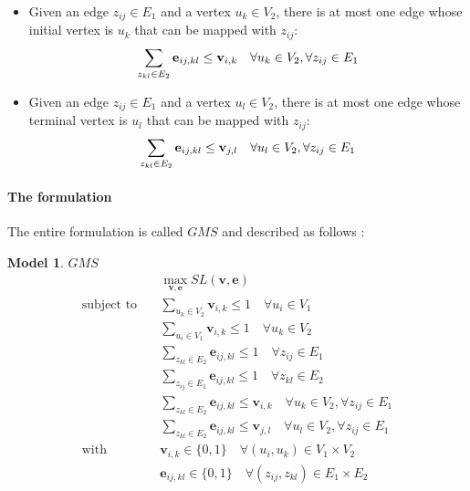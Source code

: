 \documentclass[times,onecolumn,final,authoryear]{article}
\theoremstyle{definition}
\newtheorem{model}{Model}
\begin{document}
\begin{itemize}
 \item Given an edge $z_{ij} \in E_1$ and a vertex $u_k \in V_2$, there is at most one edge whose initial vertex is $u_k$
       that can be mapped with $z_{ij}$:
       \begin{equation}
	  \sum_{z_{kl} \in E_2} \mathbf{e}_{ij,kl} \leq \mathbf{v}_{i,k} \quad \forall u_k \in V_2, \forall z_{ij} \in E_1\\
	  \label{eq:topology_3}
       \end{equation}
 \item Given an edge $z_{ij} \in E_1$ and a vertex $u_l \in V_2$, there is at most one edge whose terminal vertex is $u_l$
       that can be mapped with $z_{ij}$:
       \begin{equation}
	  \sum_{z_{kl} \in E_2} \mathbf{e}_{ij,kl} \leq \mathbf{v}_{j,l} \quad \forall u_l \in V_2, \forall z_{ij} \in E_1\\
	  \label{eq:topology_4}
       \end{equation}
\end{itemize}

\paragraph{The formulation}
The entire formulation is called $GMS$ and described as follows : 
\begin{model}{$GMS$}
\begin{subequations}
    \begin{align}
        &\max_{{\mathbf{v},\mathbf{e}}} SL(\mathbf{v},\mathbf{e}) \label{f2:o}\\
    \text{subject to}\quad
    &\sum_{u_k \in V_2} \textbf{v}_{i,k}  \leq 1 \quad \forall u_i \in V_1 \\
    &\sum_{u_i \in V_1} \textbf{v}_{i,k}  \leq 1 \quad \forall u_k \in V_2 \\
    &\sum_{z_{kl} \in E_2} \textbf{e}_{ij,kl}  \leq 1 \quad \forall z_{ij} \in E_1\\
    &\sum_{z_{ij} \in E_1} \textbf{e}_{ij,kl}  \leq 1 \quad \forall z_{kl} \in E_2 \\
      &\sum_{z_{kl} \in E_2} \mathbf{e}_{ij,kl} \leq \mathbf{v}_{i,k} \quad \forall u_k \in V_2, \forall z_{ij} \in E_1\\
      &\sum_{z_{kl} \in E_2} \mathbf{e}_{ij,kl} \leq \mathbf{v}_{j,l} \quad \forall u_l \in V_2, \forall z_{ij} \in E_1\\
    \text{with}\quad
    &\mathbf{v}_{i,k} \in \{0, 1\} \quad \forall (u_i, u_k) \in V_1 \times V_2\\
    &\mathbf{e}_{ij,kl} \in \{0, 1\} \quad \forall (z_{ij}, z_{kl}) \in E_1 \times E_2
  \end{align}
\end{subequations}
\label{model:F2}
\end{model}
\end{document}
